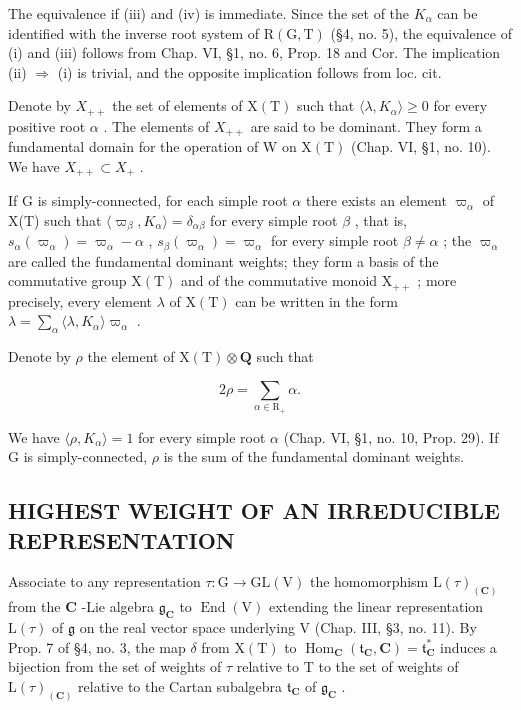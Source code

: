 The equivalence if (iii) and (iv) is immediate. Since the set of the \(K_{\alpha}\) can be identified with the inverse root system of \(\mathrm{R}(\mathrm{G},\mathrm{T})\) (§4, no. 5), the equivalence of (i) and (iii) follows from Chap. VI, §1, no. 6, Prop. 18 and Cor. The implication (ii) \(\Rightarrow\) (i) is trivial, and the opposite implication follows from loc. cit.

Denote by \(X_{++}\) the set of elements of \(\mathrm{X(T)}\) such that \(\langle\lambda,K_{\alpha}\rangle\geq0\) for every positive root \(\alpha\) . The elements of \(X_{++}\) are said to be dominant. They form a fundamental domain for the operation of W on \(\mathrm{X(T)}\) (Chap. VI, §1, no. 10). We have \(X_{++}\subset X_{+}\) .

If G is simply-connected, for each simple root \(\alpha\) there exists an element \(\varpi_{\alpha}\) of X(T) such that \(\langle\varpi_{\beta}, K_{\alpha}\rangle = \delta_{\alpha\beta}\) for every simple root \(\beta\) , that is, \(s_{\alpha}(\varpi_{\alpha}) = \varpi_{\alpha} - \alpha\) , \(s_{\beta}(\varpi_{\alpha}) = \varpi_{\alpha}\) for every simple root \(\beta \neq \alpha\) ; the \(\varpi_{\alpha}\) are called the fundamental dominant weights; they form a basis of the commutative group \(\mathrm{X(T)}\) and of the commutative monoid \(\mathrm{X}_{++}\) ; more precisely, every element \(\lambda\) of \(\mathrm{X(T)}\) can be written in the form \(\lambda = \sum_{\alpha} \langle \lambda, K_{\alpha} \rangle \varpi_{\alpha}\) .

Denote by \(\rho\) the element of \(\mathrm{X(T)}\otimes \mathbf{Q}\) such that

\[
2 \rho = \sum_ {\alpha \in \mathrm{R} _ {+}} \alpha .
\]

We have \(\langle\rho,K_{\alpha}\rangle=1\) for every simple root \(\alpha\) (Chap. VI, §1, no. 10, Prop. 29). If G is simply-connected, \(\rho\) is the sum of the fundamental dominant weights.

\subsection{HIGHEST WEIGHT OF AN IRREDUCIBLE REPRESENTATION}

Associate to any representation \(\tau : \mathrm{G} \to \mathrm{GL}(\mathrm{V})\) the homomorphism \(\mathrm{L}(\tau)_{(\mathbf{C})}\) from the \(\mathbf{C}\) -Lie algebra \(\mathfrak{g}_{\mathbf{C}}\) to \(\operatorname{End}(\mathrm{V})\) extending the linear representation \(\mathrm{L}(\tau)\) of \(\mathfrak{g}\) on the real vector space underlying V (Chap. III, §3, no. 11). By Prop. 7 of §4, no. 3, the map \(\delta\) from \(\mathrm{X}(\mathrm{T})\) to \(\operatorname{Hom}_{\mathbf{C}}(\mathfrak{t}_{\mathbf{C}}, \mathbf{C}) = \mathfrak{t}_{\mathbf{C}}^{*}\) induces a bijection from the set of weights of \(\tau\) relative to T to the set of weights of \(\mathrm{L}(\tau)_{(\mathbf{C})}\) relative to the Cartan subalgebra \(\mathfrak{t}_{\mathbf{C}}\) of \(\mathfrak{g}_{\mathbf{C}}\) .

